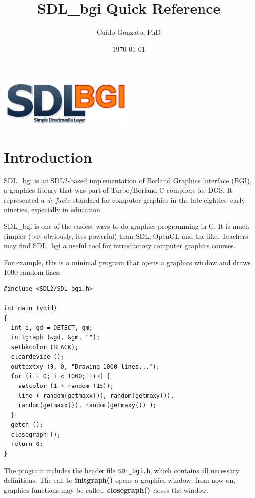 \documentclass[a4paper,11pt]{article}
\newcommand{\SDLbgi}{SDL\_bgi}
\newcommand{\func}[1]{\textbf{#1}}  %
\newcommand{\F}[1]{\texttt{#1}}     %
\begin{document}
\title{\SDLbgi{} Quick Reference}

\author{Guido Gonzato, PhD}

\date{\today}

\maketitle

\begin{center}
  \includegraphics[width=0.5\textwidth]{sdlbgi.png}  
\end{center}


\section{Introduction}

\SDLbgi{} is an SDL2-based implementation of Borland Graphics
Interface (BGI), a graphics library that was part of Turbo/Borland C
compilers for DOS. It represented a \emph{de facto} standard for
computer graphics in the late eighties--early nineties, especially in
education.

\SDLbgi{} is one of the easiest ways to do graphics programming in C.
It is much simpler (but obviously, less powerful) than SDL, OpenGL and
the like. Teachers may find \SDLbgi{} a useful tool for introductory
computer graphics courses.

For example, this is a minimal program that opens a graphics window
and draws 1000 random lines:

\begin{small}
\begin{verbatim}
#include <SDL2/SDL_bgi.h>

int main (void)
{
  int i, gd = DETECT, gm;
  initgraph (&gd, &gm, "");
  setbkcolor (BLACK);
  cleardevice ();
  outtextxy (0, 0, "Drawing 1000 lines...");
  for (i = 0; i < 1000; i++) {
    setcolor (1 + random (15));
    line ( random(getmaxx()), random(getmaxy()),
    random(getmaxx()), random(getmaxy()) );
  }
  getch ();
  closegraph ();
  return 0;
}
\end{verbatim}
\end{small}

The program includes the header file \F{SDL\_bgi.h}, which contains
all necessary definitions. The call to \func{initgraph()} opens a
graphics window; from now on, graphics functions may be called.
\func{closegraph()} closes the window.
 
\end{document}
